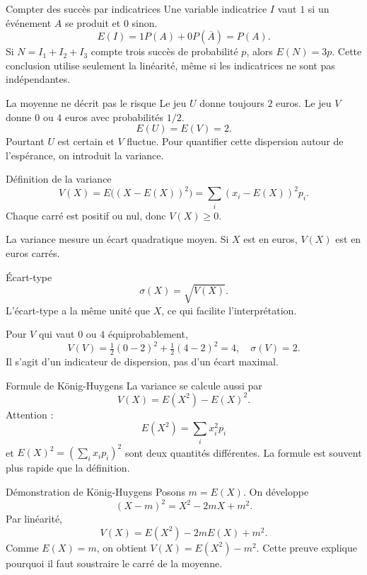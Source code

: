 \documentclass[aspectratio=169,12pt]{beamer}
\begin{document}
\renewcommand{\slidekind}{COMPRENDRE}
\begin{frame}[t,fragile]{Compter des succès par indicatrices}
Une variable indicatrice $I$ vaut $1$ si un événement $A$ se produit et $0$ sinon.\[E(I)=1P(A)+0P(\overline A)=P(A).\]Si $N=I_1+I_2+I_3$ compte trois succès de probabilité $p$, alors $E(N)=3p$. Cette conclusion utilise seulement la linéarité, même si les indicatrices ne sont pas indépendantes.
\end{frame}
\renewcommand{\slidekind}{COMPRENDRE}
\begin{frame}[t,fragile]{La moyenne ne décrit pas le risque}
Le jeu $U$ donne toujours $2$ euros. Le jeu $V$ donne $0$ ou $4$ euros avec probabilités $1/2$.\[E(U)=E(V)=2.\]Pourtant $U$ est certain et $V$ fluctue. Pour quantifier cette dispersion autour de l’espérance, on introduit la variance.
\end{frame}
\renewcommand{\slidekind}{COMPRENDRE}
\begin{frame}[t,fragile]{Définition de la variance}
\[\boxed{V(X)=E\bigl((X-E(X))^2\bigr)=\sum_i(x_i-E(X))^2p_i}.\]Chaque carré est positif ou nul, donc $V(X)\ge0$.\medskip\par La variance mesure un écart quadratique moyen. Si $X$ est en euros, $V(X)$ est en euros carrés.
\end{frame}
\renewcommand{\slidekind}{COMPRENDRE}
\begin{frame}[t,fragile]{Écart-type}
\[\boxed{\sigma(X)=\sqrt{V(X)}}.\]L’écart-type a la même unité que $X$, ce qui facilite l’interprétation.\medskip\par Pour $V$ qui vaut $0$ ou $4$ équiprobablement,\[V(V)=\tfrac12(0-2)^2+\tfrac12(4-2)^2=4,\quad\sigma(V)=2.\]Il s’agit d’un indicateur de dispersion, pas d’un écart maximal.
\end{frame}
\renewcommand{\slidekind}{COMPRENDRE}
\begin{frame}[t,fragile]{Formule de König-Huygens}
La variance se calcule aussi par\[\boxed{V(X)=E(X^2)-E(X)^2}.\]Attention :\[E(X^2)=\sum_i x_i^2p_i\]et $E(X)^2=\left(\sum_i x_ip_i\right)^2$ sont deux quantités différentes. La formule est souvent plus rapide que la définition.
\end{frame}
\renewcommand{\slidekind}{JUSTIFIER}
\begin{frame}[t,fragile]{Démonstration de König-Huygens}
Posons $m=E(X)$. On développe\[(X-m)^2=X^2-2mX+m^2.\]Par linéarité,\[V(X)=E(X^2)-2mE(X)+m^2.\]Comme $E(X)=m$, on obtient $V(X)=E(X^2)-m^2$. Cette preuve explique pourquoi il faut soustraire le carré de la moyenne.
\end{frame}
\end{document}
